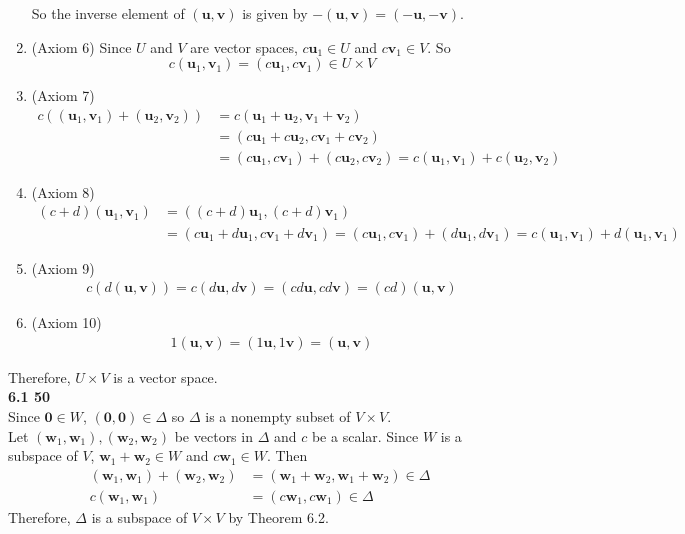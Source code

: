 \begin{enumerate}
\begin{equation*}
	\end{equation*} So the inverse element of $(\textbf{u}, \textbf{v})$ is given by $-(\textbf{u}, \textbf{v}) = (-\textbf{u}, -\textbf{v})$.
	\item (Axiom 6) Since $U$ and $V$ are vector spaces, $c\textbf{u}_1 \in U$ and $c\textbf{v}_1 \in V$. So \begin{equation*}
		c(\textbf{u}_1, \textbf{v}_1) = (c\textbf{u}_1, c\textbf{v}_1) \in U \times V
	\end{equation*}
	\item (Axiom 7) \begin{align*}
		c((\textbf{u}_1, \textbf{v}_1) + (\textbf{u}_2, \textbf{v}_2)) &= c(\textbf{u}_1 + \textbf{u}_2, \textbf{v}_1 + \textbf{v}_2) \\
		&= (c\textbf{u}_1 + c\textbf{u}_2, c\textbf{v}_1 + c\textbf{v}_2) \\
		&= (c\textbf{u}_1, c\textbf{v}_1) + (c\textbf{u}_2, c\textbf{v}_2) = c(\textbf{u}_1, \textbf{v}_1) + c(\textbf{u}_2, \textbf{v}_2)
	\end{align*}
	\item (Axiom 8) \begin{align*}
		(c + d)(\textbf{u}_1, \textbf{v}_1) &= ((c+d)\textbf{u}_1, (c+d)\textbf{v}_1) \\
		&= (c\textbf{u}_1 + d\textbf{u}_1, c\textbf{v}_1 + d\textbf{v}_1) = (c\textbf{u}_1, c\textbf{v}_1) + (d\textbf{u}_1, d\textbf{v}_1) = c(\textbf{u}_1, \textbf{v}_1) + d(\textbf{u}_1, \textbf{v}_1)
	\end{align*}
	\item (Axiom 9) \begin{align*}
		c(d(\textbf{u}, \textbf{v})) = c(d\textbf{u}, d\textbf{v}) = (cd\textbf{u}, cd\textbf{v}) = (cd)(\textbf{u}, \textbf{v})
	\end{align*}
	\item (Axiom 10) \begin{align*}
		1(\textbf{u}, \textbf{v}) = (1\textbf{u}, 1\textbf{v}) = (\textbf{u}, \textbf{v})
	\end{align*}
\end{enumerate}
Therefore, $U \times V$ is a vector space. \\

\textbf{6.1 50} \\
Since $\textbf{0} \in W$, $(\textbf{0}, \textbf{0}) \in \Delta$ so $\Delta$ is a nonempty subset of $V \times V$. \\

Let $(\textbf{w}_1, \textbf{w}_1), (\textbf{w}_2, \textbf{w}_2)$ be vectors in $\Delta$ and $c$ be a scalar. Since $W$ is a subspace of $V$, $\textbf{w}_1 + \textbf{w}_2 \in W$ and $c\textbf{w}_1 \in W$. Then \begin{align*}
	(\textbf{w}_1, \textbf{w}_1) + (\textbf{w}_2, \textbf{w}_2) &= (\textbf{w}_1 + \textbf{w}_2, \textbf{w}_1 + \textbf{w}_2) \in \Delta \\
	c(\textbf{w}_1, \textbf{w}_1) &= (c\textbf{w}_1, c\textbf{w}_1) \in \Delta
\end{align*} Therefore, $\Delta$ is a subspace of $V \times V$ by Theorem 6.2. \\

